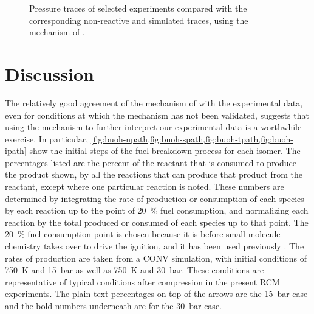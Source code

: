 \documentclass[../main.tex]{subfiles}
\begin{document}
\begin{figure}
    {\caption{Pressure traces of selected
     \tBuOH{} experiments compared with the corresponding
     non-reactive and simulated traces, using the mechanism of
     \textcite{Sarathy2012}.}
    }
\end{figure}

\section{Discussion}
\label{sec:buoh-discussion}

The relatively good agreement of the mechanism of \textcite{Sarathy2012} with
the experimental data, even for conditions at which the mechanism has not been
validated, suggests that using the mechanism to further interpret our
experimental data is a worthwhile exercise. In particular,
\cref{fig:buoh-npath,fig:buoh-spath,fig:buoh-tpath,fig:buoh-ipath}
show the initial steps of the fuel breakdown process for each isomer.
The percentages listed are the percent of the reactant that is consumed
to produce the product shown, by all the reactions that can produce
that product from the reactant, except where one particular reaction
is noted. These numbers are determined by integrating the
rate of production or consumption of each species by each reaction up to the
point of \SI{20}{\percent} fuel consumption, and normalizing each reaction by the total
produced or consumed of each species up to that point. The \SI{20}{\percent} fuel
consumption point is chosen because it is before small molecule chemistry takes
over to drive the ignition, and it has been used previously
\cite{Weber2011,Sarathy2012}. The rates of production are taken from a CONV
simulation, with initial conditions of \SI{750}{\kelvin} and \SI{15}{\bar} as well as \SI{750}{\kelvin} and
\SI{30}{\bar}. These conditions are representative of typical conditions after compression
in the present RCM experiments. The plain text percentages on top of the arrows
are the \SI{15}{\bar} case and the bold numbers underneath are for the \SI{30}{\bar} case.
\end{document}
